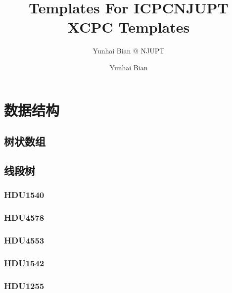 \documentclass[10pt,a4paper]{article}
\title{Templates For ICPC}
\author{Yunhai Bian @ NJUPT}
\begin{document}
\title{NJUPT XCPC Templates}
\author {Yunhai Bian}
\maketitle
\tableofcontents
\newpage
\section{数据结构}
\subsection{树状数组}

\subsection{线段树}
\subsubsection{HDU1540}
\begin{spacing}{1.5}

\end{spacing}

\subsubsection{HDU4578}
\begin{spacing}{1.5}

\end{spacing}

\subsubsection{HDU4553}
\begin{spacing}{1.5}

\end{spacing}

\subsubsection{HDU1542}
\begin{spacing}{1.5}

\end{spacing}

\subsubsection{HDU1255}
\begin{spacing}{1.5}

\end{spacing}

\end{document}
